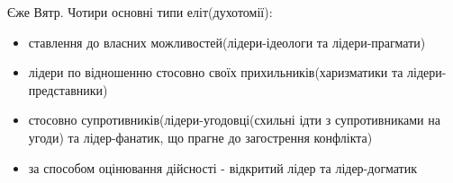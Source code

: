 Єже Вятр. Чотири основні типи еліт(духотомії):
\begin{itemize}
\item ставлення до власних можливостей(лідери-ідеологи та лідери-прагмати)
\item лідери по відношенню стосовно своїх прихильників(харизматики та лідери-представники)
\item стосовно супротивників(лідери-угодовці(схильні ідти з супротивниками на угоди) та лідер-фанатик, що прагне до загострення конфлікта)
\item за способом оцінювання дійсності - відкритий лідер та лідер-догматик
\end{itemize} 
